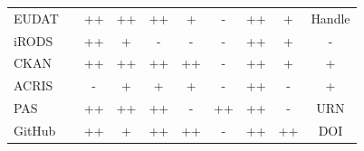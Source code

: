\begin{table}
{\begin{tabular}{| l | c | c | c | c | c | c | c | c | c |}
            \cline{3-10}\cline{1-1}
            \cellcolor{first-column-blue}EUDAT    && \cellcolor{green}++ & \cellcolor{green}++ & \cellcolor{green}++ & \cellcolor{yellow}+  & \cellcolor{red}-  &  \cellcolor{green}++ & \cellcolor{yellow}+  & \cellcolor{green}Handle \\
            \cline{3-10}\cline{1-1}
            \cellcolor{first-column-blue}iRODS    && \cellcolor{green}++ & \cellcolor{yellow}+ & \cellcolor{red}-  & \cellcolor{red}-  & \cellcolor{red}-  &  \cellcolor{green}++ & \cellcolor{yellow}+  & \cellcolor{red}- \\
            \cline{3-10}\cline{1-1}
            \cellcolor{first-column-blue}CKAN     && \cellcolor{green}++ & \cellcolor{green}++ & \cellcolor{green}++ & \cellcolor{green}++ & \cellcolor{red}-  &  \cellcolor{green}++ & \cellcolor{yellow}+  & \cellcolor{yellow}+ \\
            \cline{3-10}\cline{1-1}
            \cellcolor{first-column-blue}ACRIS    && \cellcolor{red}-  & \cellcolor{yellow}+  & \cellcolor{yellow}+  & \cellcolor{yellow}+  & \cellcolor{red}-  &  \cellcolor{green}++ & \cellcolor{red}-  & \cellcolor{yellow}+ \\
            \cline{3-10}\cline{1-1}
            \cellcolor{first-column-blue}PAS      && \cellcolor{green}++ & \cellcolor{green}++ & \cellcolor{green}++ & \cellcolor{red}-  & \cellcolor{green}++ &  \cellcolor{green}++ & \cellcolor{red}-  & \cellcolor{green}URN \\
            \cline{3-10}\cline{1-1}
            \cellcolor{first-column-blue}GitHub   && \cellcolor{green}++ & \cellcolor{yellow}+  & \cellcolor{green}++ & \cellcolor{green}++ & \cellcolor{red}-  &  \cellcolor{green}++ & \cellcolor{green}++ & \cellcolor{green}DOI \\
            \cline{3-10}\cline{1-1}
        \end{tabular}
    }
\end{table}

\clearpage

